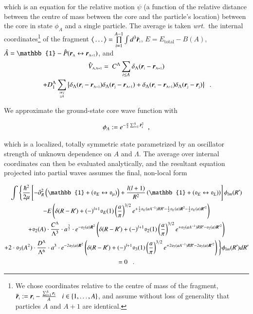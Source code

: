 \documentclass[preprint,12pt]{elsarticle}
\newcommand*{\mprime}{^{\prime}\mkern-1.2mu}
\newcommand{\lec}{C^\Lambda}
\newcommand{\led}{D^\Lambda}
\newcommand{\wrt}{\textit{wrt.}~}
\newcommand{\ve}[1]{\ensuremath{\boldsymbol{#1}}}
\newcommand{\be}{\begin{equation}}
\newcommand{\ee}{\end{equation}}
\newcommand{\bra}{\big\langle}
\newcommand{\ket}{\big\rangle}
\newcommand{\vcl}[1]{\ensuremath{\bar{\boldsymbol{r}}_\text{\tiny #1}}}
\newcommand{\vsp}[1]{\ensuremath{\boldsymbol{r}}_\text{\tiny #1}}
\newcommand{\la}{\label}
\begin{document}
which is an equation for the relative motion $\psi$ (a function of the relative distance between the centre of mass
between the core and the particle's location) between the core in state $\phi_A$ and a single particle.
The average is taken \wrt the internal coordinates\footnote{We chose coordinates relative to the centre of mass of
the fragment, \mbox{$\vcl{i}:=\vsp{i}-\frac{\scriptstyle \sum_{i=1}^A\vsp{i}}{A}\;\;\;i\in\lbrace 1,\ldots,A\rbrace$},
and assume without loss of generality that particles $A$ and $A+1$ are identical.}
of the fragment \mbox{$\bra\ldots\ket=\prod\limits_{i=1}^{A-1}\int d^3\vcl{i}$}, \mbox{$E=E_\text{total}-B(A)$},
\mbox{$\hat{A}=\mathbb{1}-\hat{P}(\vsp{A}\leftrightarrow\vsp{A+1})$}, and
\begin{gather}
\hat{V}_\text{\tiny A,A+1}=~\lec\sum\limits_{i\leq A}\delta_\Lambda(\vsp{i}-\vsp{A+1})\nonumber\\
~+D_1^\Lambda\sum\limits_{i\neq j\atop \leq A}\left\lbrace\delta_\Lambda(\vsp{i}-\vsp{A+1})\delta_\Lambda(\vsp{j}-\vsp{A+1})
+\delta_\Lambda(\vsp{i}-\vsp{A+1})\delta_\Lambda(\vsp{j}-\vsp{j})\right\rbrace\;\;.
\end{gather}

We approximate the ground-state core wave function with

\be\la{eq:corewf}
\phi_A:=e^{-\frac{a}{2}\sum_{i=1}^{A}\vcl{i}^2}\;\;,
\ee

which is a localized, totally symmetric state parametrized by an
oscillator strength of unknown dependence on $A$ and $\Lambda$. The average over internal coordinates
can then be evaluated analytically, and the resultant equation projected into partial waves
assumes the final, non-local form

\begin{subequations}\la{eq.rgm.pw}
\begin{gather}
\int\Bigg\lbrace\frac{\hbar^2}{2\mu}\left[-\partial^2_R\left(\mathbb{1}+(\mathfrak{o}_E\leftrightarrow\mathfrak{o}_\mu)\right)+
\frac{l(l+1)}{R^2}\left(\mathbb{1}+(\mathfrak{o}_E\leftrightarrow\mathfrak{o}_L)\right)\right]
\phi_{lm}(R\mprime)\la{eq.rgm.pw.a}\\
%
-E\left(\delta(R-R\mprime)+(-)^{l+1}\mathfrak{o}_E(1)\left(\frac{a}{\pi}\right)^{3/2}
e^{+\frac{1}{2}\mathfrak{o}_E(aA^{-1})RR\mprime-\frac{1}{2}\mathfrak{o}_E(a)\ve{R}^2-\frac{1}{2}\mathfrak{o}_E(a)\ve{R}'^2}\right)\la{eq.rgm.pw.b}\\
%
+\mathfrak{o}_2(A)\cdot\frac{\lec}{\Lambda^3}\cdot a^{\frac{3}{2}}\cdot
e^{-\mathfrak{o}_2(a)\ve{R}^2}
\left(\delta(R-R\mprime)+(-)^{l+1}\mathfrak{o}_2(1)\left(\frac{a}{\pi}\right)^{3/2}
e^{+\mathfrak{o}_2(aA^{-1})RR\mprime-\mathfrak{o}_2(a)\ve{R}'^2}\right)\la{eq.rgm.pw.c}\\
%
+2\cdot\mathfrak{o}_3(A^2)\cdot\frac{\led}{\Lambda^6}\cdot a^{3}\cdot
e^{-2\mathfrak{o}_3(a)\ve{R}^2}
\left(\delta(R-R\mprime)+(-)^{l+1}\mathfrak{o}_3(1)\left(\frac{a}{\pi}\right)^{3/2}
e^{+2\mathfrak{o}_3(aA^{-1})RR\mprime-2\mathfrak{o}_3(a)\ve{R}'^2}\right)
\Bigg\rbrace\phi_{lm}(R\mprime)dR\mprime\la{eq.rgm.pw.d}\\
 =0\;\;\;.\nonumber
\end{gather}
\end{subequations}
\end{document}
